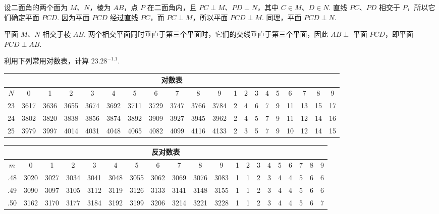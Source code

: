 \documentclass[UTF8,a4paper,oneside,11pt]{ctexbook}
\begin{document}
\begin{solution}
设二面角的两个面为 \(M\)、\(N\)，棱为 \(AB\)，点 \(P\) 在二面角内，且 \(PC\perp M\)、\(PD\perp N\)，其中 \(C\in M\)、\(D\in N\). 直线 \(PC\)、\(PD\) 相交于 \(P\)，所以它们确定平面 \(PCD\). 因为平面 \(PCD\) 经过直线 \(PC\)，而 \(PC\perp M\)，所以平面 \(PCD\perp M\). 同理，平面 \(PCD\perp N\).

平面 \(M\)、\(N\) 相交于棱 \(AB\). 两个相交平面同时垂直于第三个平面时，它们的交线垂直于第三个平面，因此 \(AB\perp\) 平面 \(PCD\)，即平面 \(PCD\perp AB\).

\end{solution}

\begin{problem}
利用下列常用对数表，计算 \(23.28^{-1.1}\).

\begin{center}
\scriptsize
\setlength{\tabcolsep}{3pt}
\renewcommand{\arraystretch}{1.1}
\begin{tabular}{|c|cccccccccc|ccccccccc|}
\hline
\multicolumn{20}{|c|}{对数表} \\
\hline
\(N\) & 0 & 1 & 2 & 3 & 4 & 5 & 6 & 7 & 8 & 9 & 1 & 2 & 3 & 4 & 5 & 6 & 7 & 8 & 9 \\
\hline
23 & 3617 & 3636 & 3655 & 3674 & 3692 & 3711 & 3729 & 3747 & 3766 & 3784 & 2 & 4 & 6 & 7 & 9 & 11 & 13 & 15 & 17 \\
24 & 3802 & 3820 & 3838 & 3856 & 3874 & 3892 & 3909 & 3927 & 3945 & 3962 & 2 & 4 & 5 & 7 & 9 & 11 & 12 & 14 & 16 \\
25 & 3979 & 3997 & 4014 & 4031 & 4048 & 4065 & 4082 & 4099 & 4116 & 4133 & 2 & 3 & 5 & 7 & 9 & 10 & 12 & 14 & 15 \\
\hline
\end{tabular}

\vspace{0.8em}

\begin{tabular}{|c|cccccccccc|ccccccccc|}
\hline
\multicolumn{20}{|c|}{反对数表} \\
\hline
\(m\) & 0 & 1 & 2 & 3 & 4 & 5 & 6 & 7 & 8 & 9 & 1 & 2 & 3 & 4 & 5 & 6 & 7 & 8 & 9 \\
\hline
.48 & 3020 & 3027 & 3034 & 3041 & 3048 & 3055 & 3062 & 3069 & 3076 & 3083 & 1 & 1 & 2 & 3 & 4 & 4 & 5 & 6 & 6 \\
.49 & 3090 & 3097 & 3105 & 3112 & 3119 & 3126 & 3133 & 3141 & 3148 & 3155 & 1 & 1 & 2 & 3 & 4 & 4 & 5 & 6 & 6 \\
.50 & 3162 & 3170 & 3177 & 3184 & 3192 & 3199 & 3206 & 3214 & 3221 & 3228 & 1 & 1 & 2 & 3 & 4 & 4 & 5 & 6 & 7 \\
\hline
\end{tabular}
\end{center}
\end{problem}
\end{document}
